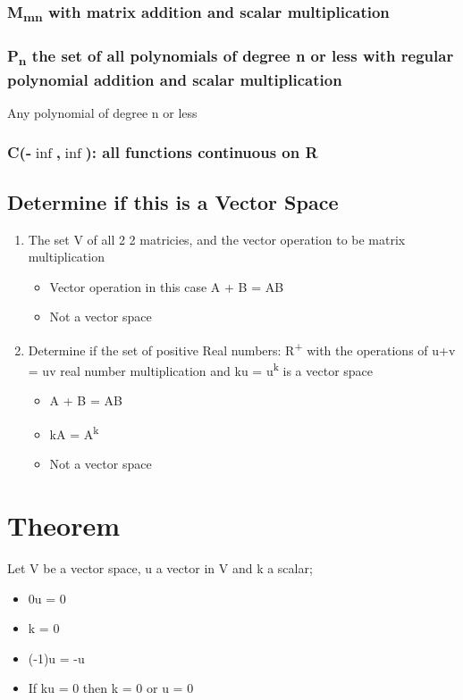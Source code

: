 \documentclass[11pt]{article}
\begin{document}
\subsubsection{M\textsubscript{m\texttimes{}n} with matrix addition and scalar multiplication}
\label{sec:orga19dfeb}
\subsubsection{P\textsubscript{n} the set of all polynomials of degree n or less with regular polynomial addition and scalar multiplication}
\label{sec:org11c4218}
Any polynomial of degree n or less
\subsubsection{C(-\(\inf\),\(\inf\)): all functions continuous on R}
\label{sec:orgad89204}
\subsection{Determine if this is a Vector Space}
\label{sec:orgf337ab3}
\begin{enumerate}
\item The set V of all 2 \texttimes{} 2 matricies, and the vector operation to be matrix multiplication
\begin{itemize}
\item Vector operation in this case A + B = AB
\item Not a vector space
\end{itemize}
\item Determine if the set of positive Real numbers: R\textsuperscript{+} with the operations of u+v = uv real number multiplication and ku = u\textsuperscript{k} is a vector space
\begin{itemize}
\item A + B = AB
\item kA = A\textsuperscript{k}
\item Not a vector space
\end{itemize}
\end{enumerate}
\section{Theorem}
\label{sec:org10dc73b}
Let V be a vector space, u a vector in V and k a scalar;
\begin{itemize}
\item 0u = 0
\item k = 0
\item (-1)u = -u
\item If ku = 0 then k = 0 or u = 0
\end{itemize}
\end{document}
